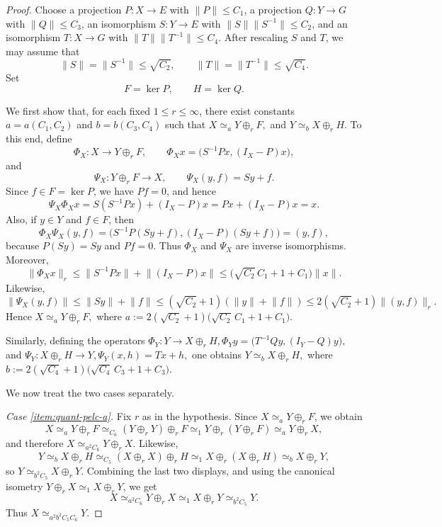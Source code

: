 \documentclass[11pt]{amsart}
\theoremstyle{plain}
\theoremstyle{definition}
\numberwithin{equation}{section}
\newcommand{\norm}[1]{\lVert #1 \rVert}
\renewcommand{\le}{\leqslant}
\begin{document}
\begin{proof}
Choose a projection $P \colon X \to E$ with $\norm{P} \le C_1$, a projection $Q \colon Y \to G$ with $\norm{Q} \le C_3$, an isomorphism $S \colon Y \to E$ with $\norm{S}\norm{S^{-1}} \le C_2$, and an isomorphism $T \colon X \to G$ with $\norm{T}\norm{T^{-1}} \le C_4$.
After rescaling $S$ and $T$, we may assume that
\[
    \norm{S}=\norm{S^{-1}} \le \sqrt{C_2},
    \qquad
    \norm{T}=\norm{T^{-1}} \le \sqrt{C_4}.
\]
Set
\[
    F = \ker P,
    \qquad
    H = \ker Q.
\]

We first show that, for each fixed $1 \le r \le \infty$, there exist constants $a=a(C_1,C_2)$ and $b=b(C_3,C_4)$ such that
\(
    X \simeq_a Y \oplus_r F,
\)
and
\(
    Y \simeq_b X \oplus_r H.
\)
To this end, define
\[
    \Phi_X \colon X \to Y \oplus_r F,
    \qquad
    \Phi_X x = \bigl(S^{-1}Px,(I_X-P)x\bigr),
\]
and
\[
    \Psi_X \colon Y \oplus_r F \to X,
    \qquad
    \Psi_X(y,f)=Sy+f.
\]
Since $f \in F=\ker P$, we have $Pf=0$, and hence
\[
    \Psi_X\Phi_X x = S(S^{-1}Px)+(I_X-P)x = Px+(I_X-P)x = x.
\]
Also, if $y \in Y$ and $f \in F$, then
\[
    \Phi_X\Psi_X(y,f)=\bigl(S^{-1}P(Sy+f),(I_X-P)(Sy+f)\bigr)=(y,f),
\]
because $P(Sy)=Sy$ and $Pf=0$.
Thus $\Phi_X$ and $\Psi_X$ are inverse isomorphisms. Moreover,
\[
    \norm{\Phi_X x}_r \le \norm{S^{-1}Px}+\norm{(I_X-P)x}
    \le \bigl(\sqrt{C_2}\,C_1+1+C_1\bigr)\norm{x}.
\]
Likewise,
\[
    \norm{\Psi_X(y,f)} \le \norm{Sy}+\norm{f}
    \le (\sqrt{C_2}+1)(\norm{y}+\norm{f})
    \le 2(\sqrt{C_2}+1)\norm{(y,f)}_r.
\]
Hence
\(
    X \simeq_a Y \oplus_r F,
\)
where
\(
    a := 2(\sqrt{C_2}+1)\bigl(\sqrt{C_2}\,C_1+1+C_1\bigr).
\)

Similarly, defining the operators 
\(
    \Phi_Y \colon Y \to X \oplus_r H, 
    \Phi_Y y = \bigl(T^{-1}Qy,(I_Y-Q)y\bigr),
\)
and
\(
    \Psi_Y \colon X \oplus_r H \to Y, 
    \Psi_Y(x,h)=Tx+h,
\)
one obtains
\(
    Y \simeq_b X \oplus_r H,
\)
where
\(
    b := 2(\sqrt{C_4}+1)\bigl(\sqrt{C_4}\,C_3+1+C_3\bigr).
\)

We now treat the two cases separately.

\smallskip
\noindent
\textit{Case \ref{item:quant-pelc-a}.}
Fix $r$ as in the hypothesis.
Since $X \simeq_a Y \oplus_r F$, we obtain
\[
    X \simeq_a Y \oplus_r F
    \simeq_{C_6} (Y \oplus_r Y)\oplus_r F
    \simeq_1 Y \oplus_r (Y \oplus_r F)
    \simeq_a Y \oplus_r X,
\]
and therefore
\(
    X \simeq_{a^2C_6} Y \oplus_r X.
\)
Likewise,
\[
    Y \simeq_b X \oplus_r H
    \simeq_{C_5} (X \oplus_r X)\oplus_r H
    \simeq_1 X \oplus_r (X \oplus_r H)
    \simeq_b X \oplus_r Y,
\]
so
\(
    Y \simeq_{b^2C_5} X \oplus_r Y.
\)
Combining the last two displays, and using the canonical isometry $Y \oplus_r X \simeq_1 X \oplus_r Y$, we get
\[
    X \simeq_{a^2C_6} Y \oplus_r X
    \simeq_1 X \oplus_r Y
    \simeq_{b^2C_5} Y.
\]
Thus
\(
    X \simeq_{a^2b^2C_5C_6} Y.
\)


\end{proof}
\end{document}
